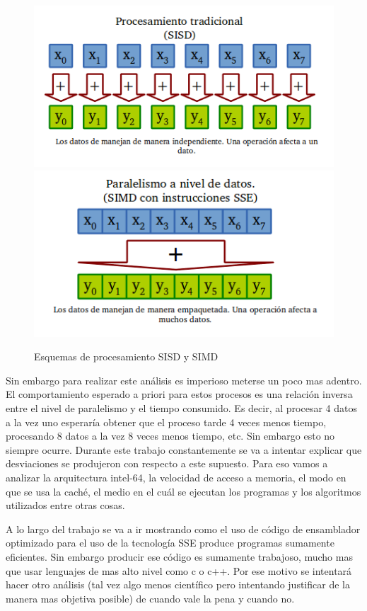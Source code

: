 \begin{figure}[h]
\begin{center}
  \includegraphics[scale=0.4]{secciones/introduccion/imagenes/SISD.png}
    \includegraphics[scale=0.4]{secciones/introduccion/imagenes/SIMD.png}
\end{center}
\caption{Esquemas de procesamiento SISD y SIMD}
\label{fig:SISD-SIMD}
\end{figure}


	Sin embargo para realizar este análisis es imperioso meterse un poco mas adentro.
El comportamiento esperado a priori para estos procesos es una relación inversa entre
el nivel de paralelismo y el tiempo consumido. Es decir, al procesar 4 datos a la vez
uno esperaría obtener que el proceso tarde 4 veces menos tiempo, procesando 8 datos
a la vez 8 veces menos tiempo, etc. Sin embargo esto no siempre ocurre. Durante
este trabajo constantemente se va a intentar explicar que desviaciones se 
produjeron con respecto a este supuesto. Para eso vamos a analizar la arquitectura
intel-64, la velocidad de acceso a memoria, el modo en que se usa la caché,
el medio en el cuál se ejecutan los programas y los algoritmos utilizados entre
otras cosas.

	A lo largo del trabajo se va a ir mostrando como el uso de código de ensamblador
optimizado para el uso de la tecnología SSE produce programas sumamente eficientes. Sin embargo
producir ese código es sumamente trabajoso, mucho mas que usar lenguajes de mas alto nivel como
c o c++. Por ese motivo se intentará hacer otro análisis (tal vez algo menos científico
pero intentando justificar de la manera mas objetiva posible) de cuando vale la pena y cuando no.


